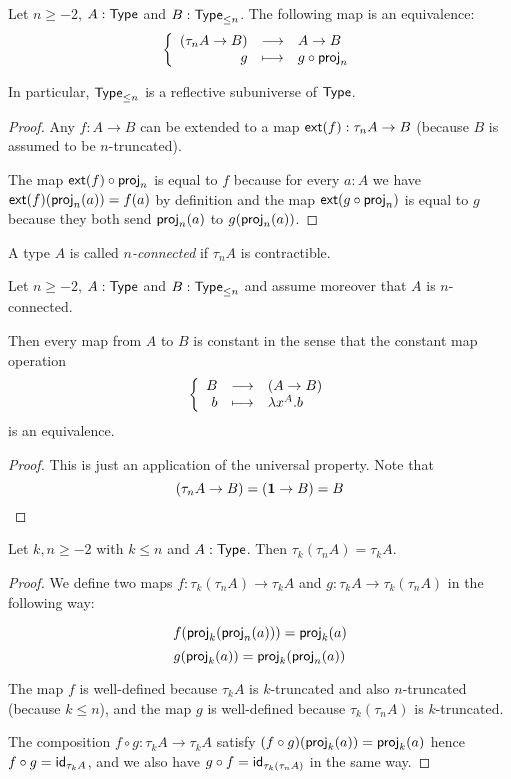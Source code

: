 \begin{lem}

  Let $n\ge-2$, $A:\type$ and $B:\typele{n}$. The following map is an
  equivalence:
  \[\function{(\tau_nA\to{}B)}{A\to{}B}{g}{g\circ\tproj_n}\]

  In particular, $\typele{n}$ is a reflective subuniverse of $\type$.
\end{lem}

\begin{proof}
  Any $f:A\to{}B$ can be extended to a map $\extend{f}:\tau_nA\to{}B$ (because
  $B$ is assumed to be $n$-truncated).

  The map $\extend{f}\circ\tproj_n$ is equal to $f$ because for every $a:A$ we
  have $\extend{f}(\tproj_n(a))=f(a)$ by definition and the map
  $\extend{g\circ\tproj_n}$ is equal to $g$ because they both send $\tproj_n(a)$
  to $g(\tproj_n(a))$.
\end{proof}

\begin{defn}
  A type $A$ is called \emph{$n$-connected} if $\tau_nA$ is contractible.
\end{defn}

\begin{lem}
  \label{connectedtotruncated}
  Let $n\ge-2$, $A:\type$ and $B:\typele{n}$ and assume moreover that $A$ is
  $n$-connected.

  Then every map from $A$ to $B$ is constant in the sense that the constant map
  operation
  \[\function{B}{(A\to{}B)}{b}{\lambda{}x^A.b}\]
  is an equivalence.
\end{lem}
\begin{proof}
  This is just an application of the universal property. Note that
  \[(\tau_nA\to{}B)=(\unit\to{}B)=B\]
\end{proof}

\begin{lem}
  Let $k,n\ge-2$ with $k\le{}n$ and $A:\type$. Then
  $\tau_k(\tau_nA)=\tau_kA$.
\end{lem}
\begin{proof}
  We define two maps $f:\tau_k(\tau_nA)\to\tau_kA$ and
  $g:\tau_kA\to\tau_k(\tau_nA)$ in the following way:

  \[f(\tproj_k(\tproj_n(a)))=\tproj_k(a)\]
  \[g(\tproj_k(a))=\tproj_k(\tproj_n(a))\]

  The map $f$ is well-defined because $\tau_kA$ is $k$-truncated and also
  $n$-truncated (because $k\le{}n$), and the map $g$ is well-defined because
  $\tau_k(\tau_nA)$ is $k$-truncated.

  The composition $f\circ{}g:\tau_kA\to\tau_kA$ satisfy
  $(f\circ{}g)(\tproj_k(a))=\tproj_k(a)$ hence $f\circ{}g=\idfunc[\tau_kA]$, and
  we also have $g\circ{}f=\idfunc[\tau_k(\tau_nA)]$ in the same way.
\end{proof}

